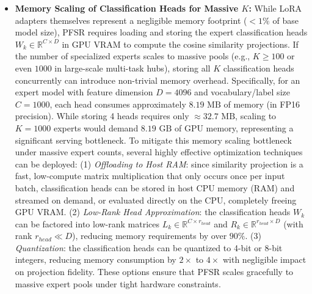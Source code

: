 \begin{itemize}
    \item \textbf{Memory Scaling of Classification Heads for Massive $K$:} While LoRA adapters themselves represent a negligible memory footprint ($< 1\%$ of base model size), PFSR requires loading and storing the expert classification heads $W_k \in \mathbb{R}^{C \times D}$ in GPU VRAM to compute the cosine similarity projections. If the number of specialized experts scales to massive pools (e.g., $K \ge 100$ or even $1000$ in large-scale multi-task hubs), storing all $K$ classification heads concurrently can introduce non-trivial memory overhead. Specifically, for an expert model with feature dimension $D=4096$ and vocabulary/label size $C=1000$, each head consumes approximately $8.19\text{ MB}$ of memory (in FP16 precision). While storing 4 heads requires only $\approx 32.7\text{ MB}$, scaling to $K=1000$ experts would demand $8.19\text{ GB}$ of GPU memory, representing a significant serving bottleneck. To mitigate this memory scaling bottleneck under massive expert counts, several highly effective optimization techniques can be deployed: (1) \emph{Offloading to Host RAM}: since similarity projection is a fast, low-compute matrix multiplication that only occurs once per input batch, classification heads can be stored in host CPU memory (RAM) and streamed on demand, or evaluated directly on the CPU, completely freeing GPU VRAM. (2) \emph{Low-Rank Head Approximation}: the classification heads $W_k$ can be factored into low-rank matrices $L_k \in \mathbb{R}^{C \times r_{head}}$ and $R_k \in \mathbb{R}^{r_{head} \times D}$ (with rank $r_{head} \ll D$), reducing memory requirements by over $90\%$. (3) \emph{Quantization}: the classification heads can be quantized to 4-bit or 8-bit integers, reducing memory consumption by $2\times$ to $4\times$ with negligible impact on projection fidelity. These options ensure that PFSR scales gracefully to massive expert pools under tight hardware constraints.

\end{itemize}

